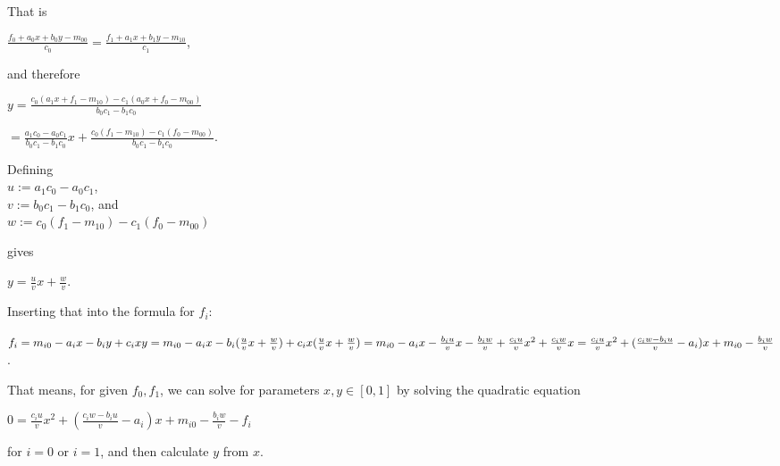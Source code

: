 \documentclass[a4paper]{article}
\begin{document}
That is

$\frac{f_0+a_0x+b_0y-m_{00}}{c_0}=\frac{f_1+a_1x+b_1y-m_{10}}{c_1}$,

and therefore

$y=\frac{c_0(a_1x+f_1-m_{10})-c_1(a_0x+f_0-m_{00})}{b_0c_1-b_1c_0}$

$=\frac{a_1c_0-a_0c_1}{b_0c_1-b_1c_0}x+\frac{c_0(f_1-m_{10})-c_1(f_0-m_{00})}{b_0c_1-b_1c_0}$.

\newpage
Defining
\\ $u:=a_1c_0-a_0c_1$,
\\ $v:=b_0c_1-b_1c_0$, and
\\ $w:=c_0(f_1-m_{10})-c_1(f_0-m_{00})$

gives

$y=\frac{u}{v}x+\frac{w}{v}$.

Inserting that into the formula for $f_i$:

$f_i=m_{i0}-a_ix-b_iy+c_ixy
\\ =m_{i0}-a_ix-b_i(\frac{u}{v}x+\frac{w}{v})+c_ix(\frac{u}{v}x+\frac{w}{v})
\\ =m_{i0}-a_ix-\frac{b_iu}{v}x-\frac{b_iw}{v}+\frac{c_iu}{v}x^2+\frac{c_iw}{v}x
\\ =\frac{c_iu}{v}x^2+(\frac{c_iw-b_iu}{v}-a_i)x+m_{i0}-\frac{b_iw}{v}$.

That means, for given $f_0, f_1$, we can solve for parameters $x, y\in[0,1]$ by solving the quadratic equation

$0=\frac{c_iu}{v}x^2+(\frac{c_iw-b_iu}{v}-a_i)x+m_{i0}-\frac{b_iw}{v}-f_i$

for $i=0$ or $i=1$, and then calculate $y$ from $x$.
\end{document}
